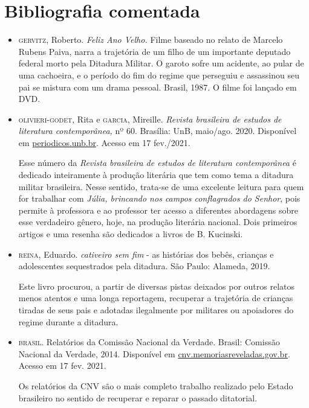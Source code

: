 \documentclass[12pt]{extarticle}
\begin{document}
\section{Bibliografia comentada}

\begin{itemize}

\item \textsc{gervitz}, Roberto. \emph{Feliz Ano Velho.} Filme baseado no relato de Marcelo Rubens Paiva, narra a trajetória de um filho de um importante deputado federal morto pela Ditadura Militar. O garoto sofre um acidente, ao pular de uma cachoeira, e o período do fim do regime que perseguiu e assassinou seu pai se mistura com um drama pessoal. Brasil, 1987. O filme foi lançado em DVD. 

\item \textsc{olivieri-godet}, Rita e \textsc{garcia}, Mireille. \emph{Revista brasileira de
estudos de literatura contemporânea,} nº 60. Brasília: UnB, maio/ago.
2020. Disponível em
\href{periodicos.unb.br/index.php/estudos/issue/view/1995}{periodicos.unb.br}.
Acesso em 17 fev./2021.

Esse número da \emph{Revista brasileira de estudos de literatura
contemporânea} é dedicado inteiramente à produção literária que tem como
tema a ditadura militar brasileira. Nesse sentido, trata-se de uma
excelente leitura para quem for trabalhar com \emph{Júlia, brincando nos
campos conflagrados do Senhor}, pois permite à professora e ao professor
ter acesso a diferentes abordagens sobre esse verdadeiro gênero, hoje,
na produção literária nacional. Dois primeiros artigos e uma resenha são
dedicados a livros de B. Kucinski.

\item \textsc{reina}, Eduardo. \emph{cativeiro sem fim} - as histórias dos bebês,
crianças e adolescentes sequestrados pela ditadura. São Paulo: Alameda,
2019.

Este livro procurou, a partir de diversas pistas deixados por outros
relatos menos atentos e uma longa reportagem, recuperar a trajetória de
crianças tiradas de seus pais e adotadas ilegalmente por militares ou
apoiadores do regime durante a ditadura.

\item \textsc{brasil}. Relatórios da Comissão Nacional da Verdade. Brasil: Comissão
Nacional da Verdade, 2014. Disponível em
\href{http://cnv.memoriasreveladas.gov.br/}{{cnv.memoriasreveladas.gov.br}}.
Acesso em 17 fev. 2021.

Os relatórios da CNV são o mais completo trabalho realizado pelo Estado
brasileiro no sentido de recuperar e reparar o passado ditatorial.


\end{itemize}
\end{document}

